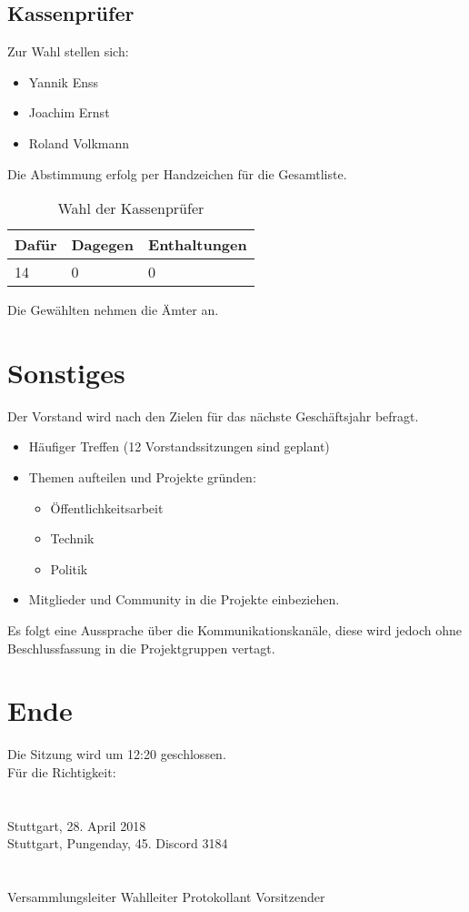\documentclass[a4paper]{scrartcl}
\begin{document}
\subsection{Kassenprüfer}
Zur Wahl stellen sich:
\begin{itemize}
\item Yannik Enss
\item Joachim Ernst
\item Roland Volkmann
\end{itemize}
Die Abstimmung erfolg per Handzeichen für die Gesamtliste.
\begin{table}[H]
\begin{tabularx}{\textwidth}{XXX}
Dafür & Dagegen & Enthaltungen\\
\toprule
14 & 0 & 0\\
\end{tabularx}
\caption{Wahl der Kassenprüfer}
\end{table}
Die Gewählten nehmen die Ämter an.
\clearpage

\section{Sonstiges}

Der Vorstand wird nach den Zielen für das nächste Geschäftsjahr befragt.
\begin{itemize}
\item Häufiger Treffen (12 Vorstandssitzungen sind geplant)
\item Themen aufteilen und Projekte gründen:
\begin{itemize}
\item Öffentlichkeitsarbeit
\item Technik
\item Politik
\end{itemize}
\item Mitglieder und Community in die Projekte einbeziehen.
\end{itemize}
Es folgt eine Aussprache über die Kommunikationskanäle, diese wird jedoch ohne Beschlussfassung in die Projektgruppen vertagt.
\section{Ende}
Die Sitzung wird um 12:20 geschlossen.
\vfill
\mbox{}\\
Für die Richtigkeit:\\
\\
\\
Stuttgart, 28. April 2018\\
Stuttgart, Pungenday, 45. Discord 3184 \\
\\
\\
\hfill Versammlungsleiter \hfill Wahlleiter \hfill Protokollant \hfill Vorsitzender \hfill
\end{document}
